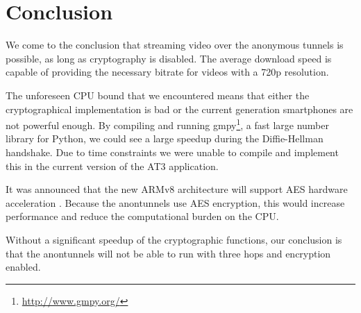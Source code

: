 \section{Conclusion}
\label{sec:experiments:conclusion}
	We come to the conclusion that streaming video over the anonymous tunnels is possible, as long as cryptography is disabled. The average download speed is capable of providing the necessary bitrate for videos with a 720p resolution. %
	
	The unforeseen CPU bound that we encountered means that either the cryptographical implementation is bad or the current generation smartphones are not powerful enough. By compiling and running gmpy\footnote{\url{http://www.gmpy.org/}}, a fast large number library for Python, we could see a large speedup during the Diffie-Hellman handshake. Due to time constraints we were unable to compile and implement this in the current version of the AT3 application.
	
	It was announced that the new ARMv8 architecture will support AES hardware acceleration \cite{armv8anouncement}. Because the anontunnels use AES encryption, this would increase performance and reduce the computational burden on the CPU. %
	
	Without a significant speedup of the cryptographic functions, our conclusion is that the anontunnels will not be able to run with three hops and encryption enabled.
